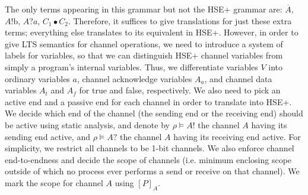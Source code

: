 \documentclass{article}
\begin{document}
The only terms appearing in this grammar but not the HSE+ grammar are: $\overline{A}$, $A!\mathrm{b}$, $A?a$, $C_1 \bullet C_2$.
Therefore, it suffices to give translations for just these extra terms; everything else translates to its equivalent in HSE+.
However, in order to give LTS semantics for channel operations, we need to introduce a system of labels for variables, so that we can distinguish HSE+ channel variables from simply a program's internal variables.
Thus, we differentiate variables $V$ into ordinary variables $a$, channel acknowledge variables $A_a$, and channel data variables $A_t$ and $A_f$ for true and false, respectively.
We also need to pick an active end and a passive end for each channel in order to translate into HSE+.
We decide which end of the channel (the sending end or the receiving end) should be active using static analysis, and denote by $\rho \vDash A!$ the channel $A$ having its sending end active, and $\rho \vDash A?$ the channel $A$ having its receiving end active.
For simplicity, we restrict all channels to be 1-bit channels.
We also enforce channel end-to-endness and decide the scope of channels (i.e. minimum enclosing scope outside of which no process ever performs a send or receive on that channel).
We mark the scope for channel $A$ using $[P]_A$.
\end{document}

